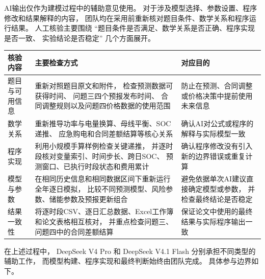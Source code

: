 \documentclass[UTF8,a4paper,11pt]{ctexart}
\begin{document}
AI输出仅作为建模过程中的辅助意见使用。
对于涉及模型选择、参数设置、程序修改和结果解释的内容，
团队均在采用前重新核对题目条件、数学关系和程序运行结果。
人工核验主要围绕
“题目条件是否满足、数学关系是否正确、程序实现是否一致、
实验结论是否稳定”
几个方面展开。

\begin{center}
\small
\begin{tabularx}{\textwidth}{
    L{0.20\textwidth}
    Y
    Y
}
\toprule
\textbf{核验内容} &
\textbf{主要检查方式} &
\textbf{对应目的} \\
\midrule

题目与可用信息 &
重新对照题目原文和附件，
检查预测数据可获得时间、
问题三四个预报发布时间、
合同调整规则以及问题四价格数据的使用范围 &
防止在预测、合同调整或价格决策中提前使用未来信息 \\

数学关系 &
重新推导功率与电量换算、母线平衡、SOC递推、
应急购电和合同差额结算等核心关系 &
确认AI对公式或程序的解释与实际模型一致 \\

程序实现 &
利用小规模手算样例检查关键递推，
并逐时段核对变量索引、时间步长、跨日SOC、
预测窗口、已执行时段状态和费用累计 &
确认程序修改没有引入新的边界错误或重复计算 \\

模型与参数 &
在相同历史信息和相同数据区间下重新运行全年逐日模拟，
比较不同预测模型、风险参数、储能参数及预报更新组合 &
避免依据单次AI建议直接确定模型或参数，
并检查最终结论是否稳定 \\

结果一致性 &
将逐时段CSV、逐日汇总数据、Excel工作簿和论文表格相互核对，
并重点检查问题三、问题四中的合同差额结算 &
保证论文中使用的最终结果与实际程序输出一致 \\

\bottomrule
\end{tabularx}
\end{center}

\vspace{0.5em}

在上述过程中，
DeepSeek V4 Pro 和 DeepSeek V4.1 Flash
分别承担不同类型的辅助工作，
而模型构建、程序实现和最终判断始终由团队完成。
具体参与边界如下。
\end{document}
